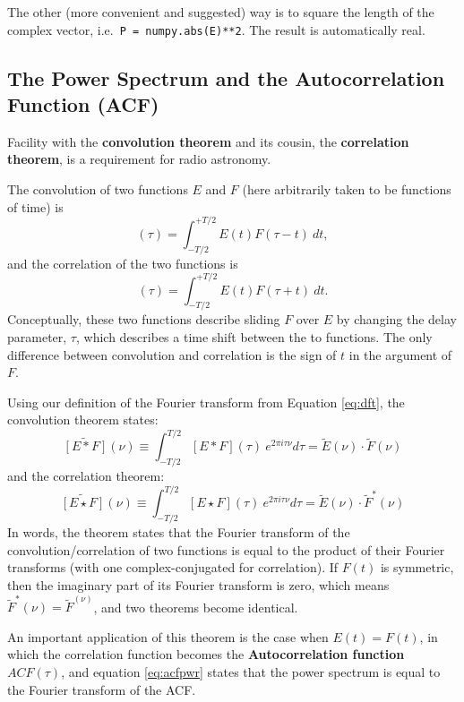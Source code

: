 \documentclass[11pt,preprint]{aastex}
\begin{document}
The other (more convenient and suggested) way is to square the length of
the complex vector, i.e.\ \verb$P = numpy.abs(E)**2$. The result is
automatically real.


\subsection{The Power Spectrum and the Autocorrelation Function
  (ACF)} \label{acf}

\noindent
Facility with the {\bf convolution theorem} and its cousin,
the {\bf correlation theorem}, 
is a requirement for radio astronomy. 

The convolution of two functions $E$ and $F$ (here arbitrarily taken
to be functions of time) is
%
\begin{equation}
[E * F](\tau) = \int_{-T/2}^{+T/2} E(t) F(\tau - t) \ dt,
\end{equation}
%
and the correlation of the two functions is
%
\begin{equation}
[E\star F](\tau) = \int_{-T/2}^{+T/2} E(t) F(\tau + t) \ dt.
\end{equation}
%
\noindent Conceptually, these two functions describe sliding $F$ over
$E$ by changing the delay parameter, $\tau$, which describes a
time shift between the to functions.
The only difference between convolution and correlation is the sign of $t$ in the argument of
$F$.

Using our definition of the Fourier transform from
Equation \ref{eq:dft}, the convolution theorem states:
%
\begin{equation}
\widetilde{[E*F]}(\nu)\equiv\int_{-T/2}^{T/2} [E*F](\tau)~e^{2\pi i \tau\nu} d\tau =
    \tilde E(\nu) \cdot \tilde F(\nu)
\end{equation}
%
and the correlation theorem:
\begin{equation}
\widetilde{[E\star F]}(\nu)\equiv\int_{-T/2}^{T/2} [E\star F](\tau)~e^{2\pi i \tau\nu} d\tau =
    \tilde E(\nu) \cdot \tilde F^*(\nu)
\label{eq:acfpwr}
\end{equation}
%
In words, the theorem states that the Fourier transform of
  the convolution/correlation of two functions is equal to the product of their
  Fourier transforms (with one complex-conjugated for correlation).
If $F(t)$ is
symmetric, then the imaginary part of its Fourier transform is zero,
which means $\tilde F^*(\nu) = \tilde F^(\nu)$, and two theorems become
identical.

An important application of this theorem is the case when
$E(t)=F(t)$, in which the correlation function becomes the {\bf
  Autocorrelation function} $ACF(\tau)$, and equation \ref{eq:acfpwr}
states that the power spectrum is equal to the Fourier
  transform of the ACF.
\end{document}
